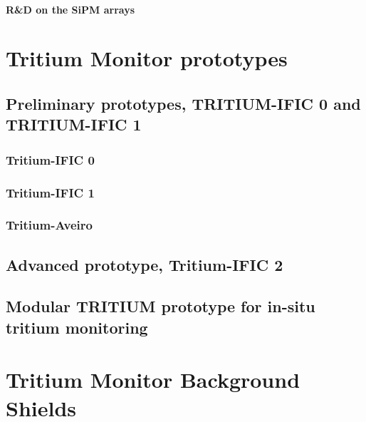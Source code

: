 \documentclass[12pt,a4paper]{book}
\begin{document}
			\subsubsection{R\&D on the SiPM arrays}
			\newpage

\chapter{Tritium Monitor prototypes}\label{chap:Prototypes}		
	\section{Preliminary prototypes, TRITIUM-IFIC 0 and TRITIUM-IFIC 1}\label{Preliminary_prototypes}
		\subsection{Tritium-IFIC 0}
		\newpage
		
		\subsection{Tritium-IFIC 1}
		\newpage
		
		\subsection{Tritium-Aveiro}
		\newpage
		
	\section{Advanced prototype, Tritium-IFIC 2}
		\newpage
		
	\section{Modular TRITIUM prototype for in-situ tritium monitoring}
		\newpage
		
\chapter{Tritium Monitor Background Shields}\label{chap:Shields}
\end{document}
